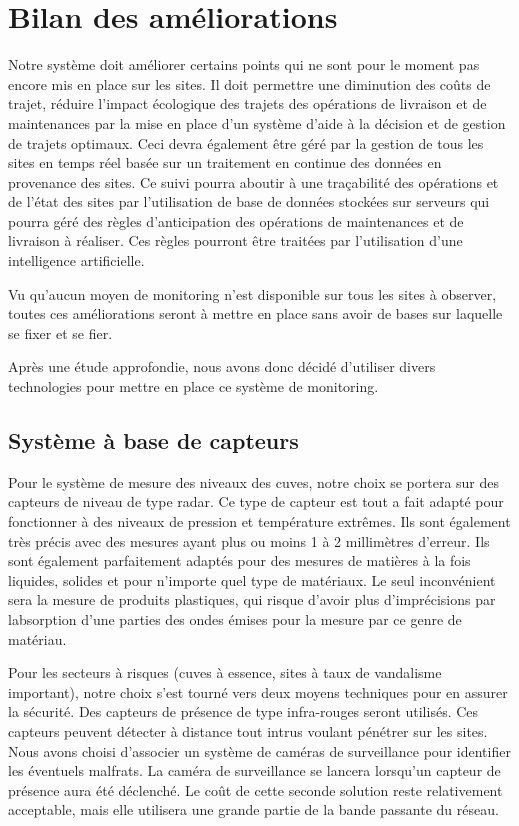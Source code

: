 \documentclass{mise_en_page}
\begin{document}
\section{Bilan des améliorations}
Notre système doit améliorer certains points qui ne sont pour le moment
pas encore mis en place sur les sites. Il doit permettre une diminution
des coûts de trajet, réduire l’impact écologique des trajets des
opérations de livraison et de maintenances par la mise en place d’un
système d’aide à la décision et de gestion de trajets optimaux. Ceci
devra également être géré par la gestion de tous les sites en temps
réel basée sur un traitement en continue des données en provenance des
sites. Ce suivi pourra aboutir à une traçabilité des opérations et de
l’état des sites par l’utilisation de base de données stockées sur
serveurs qui pourra géré des règles d’anticipation des opérations de
maintenances et de livraison à réaliser. Ces règles pourront être
traitées par l’utilisation d’une intelligence artificielle.

Vu qu’aucun moyen de monitoring n’est disponible sur tous les sites à
observer, toutes ces améliorations seront à mettre en place sans avoir
de bases sur laquelle se fixer et se fier.

Après une étude approfondie, nous avons donc décidé d’utiliser divers
technologies pour mettre en place ce système de monitoring.

\subsection{Système à base de capteurs}
Pour le système de mesure des niveaux des cuves, notre choix se portera
sur des capteurs de niveau de type radar. Ce type de capteur est tout a
fait adapté pour fonctionner à des niveaux de pression et température
extrêmes. Ils sont également très précis avec des mesures ayant plus ou
moins 1 à 2 millimètres d’erreur. Ils sont également parfaitement
adaptés pour des mesures de matières à la fois liquides, solides et
pour n’importe quel type de matériaux. Le seul inconvénient sera la
mesure de produits plastiques, qui risque d’avoir plus d’imprécisions 
par l{\textquotesingle}absorption d’une parties des ondes émises pour
la mesure par ce genre de matériau.

Pour les secteurs à risques (cuves à essence, sites à taux de vandalisme
important), notre choix s’est tourné vers deux moyens techniques pour
en assurer la sécurité. Des capteurs de présence de type infra-rouges
seront utilisés. Ces capteurs peuvent détecter à distance tout intrus
voulant pénétrer sur les sites. Nous avons choisi d’associer un système
de caméras de surveillance pour identifier les éventuels malfrats. La
caméra de surveillance se lancera lorsqu’un capteur de présence aura
été déclenché. Le coût de cette seconde solution reste relativement
acceptable, mais elle utilisera une grande partie de la bande passante
du réseau.
\end{document}

